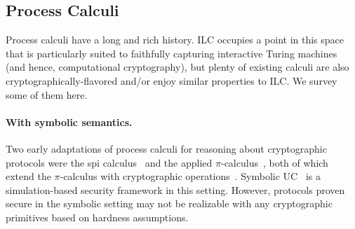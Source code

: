\subsection{Process Calculi}
\label{subsec:process-calculi}

Process calculi have a long and rich history. ILC occupies a point in this space
that is particularly suited to faithfully capturing interactive Turing machines
(and hence, computational cryptography), but plenty of existing calculi are also
cryptographically-flavored and/or enjoy similar properties to ILC.
We survey
some of them here.

\paragraph{With symbolic semantics.}
Two early adaptations of process calculi for reasoning about
cryptographic protocols were the spi calculus~\cite{abadi1999calculus} and the
applied $\pi$-calculus~\cite{abadi2001mobile}, both of which extend the
$\pi$-calculus with cryptographic
operations~\cite{milner1999communicating}.
Symbolic UC~\cite{bohl2016symbolic} is a simulation-based security framework
in this setting.
However, protocols proven secure in the symbolic setting may not be realizable
with any cryptographic primitives based on hardness assumptions.


